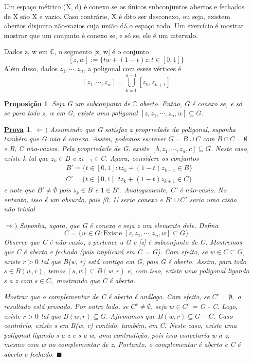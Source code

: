 \documentclass{article}
\newtheorem*{proof*}{\underline{Prova}}
\newtheorem*{prop*}{\underline{Proposi\c c\~ao}}
\renewcommand\qedsymbol{$\blacksquare$}
\begin{document}
  Um espa\c co m\'etrico (X, d) \'e conexo se os \'unicos subconjuntos abertos e fechados de X s\~ao X e vazio. Caso contr\'ario,
X \'e dito ser desconexo, ou seja, existem abertos disjunto n\~ao-vazios cuja uni\~ao d\'a o espa\c co todo. Um exerc\'icio \'e mostrar
mostrar que um conjunto \'e conexo se, e s\'o se, ele \'e um intervalo.

  Dados z, w em $\mathbb{C}$, o segmento [z, w] \'e o conjunto
  $$
  [z, w]:= \{tw + (1-t)z: t\in[0, 1]\}
  $$
  Al\'em disso, dados $z _{1}, \cdots, z _{n}$, a poligonal com esses v\'ertices \'e
  $$
  [z _{1}, \cdots, z _{n}] = \bigcup _{k=1}^{n-1}[z _{k}, z _{k+1}]
  $$
 \begin{prop*}
   Seja G um subconjunto de $\mathbb{C}$ aberto. Ent\~ao, G \'e conexo se, e s\'o se para todo z, w em G, existe uma poligonal
  $[z, z _{1}, \cdots, z _{n}, w]\subseteq{G}.$
 \end{prop*}
\begin{proof*}
  $\Leftarrow)$ Assumindo que G satisfaz a propriedade da poligonal, suponha tamb\'em que G n\~ao \'e conexo. Assim,
podemos escrever $G = B\cup{C}$ com $B\cap{C}=\emptyset$ e B, C n\~ao-vazios. Pela propriedade de G, existe 
  $[b, z _{1}, \cdots, z _{n}, c]\subseteq{G}$. Neste caso, existe k tal que $z _{k}\in{B}$ e $z _{k+1}\in{C}.$ Agora,
  considere os conjuntos 
 \begin{align*}
   &B' = \{t\in[0, 1]: tz _{k} + (1 - t)z _{k+1}\in{B}\}\\
   &C' = \{t\in[0, 1]: tz _{k} + (1 - t)z _{k+1}\in{C}\}
 \end{align*}
e note que $B'\neq{\emptyset}$ pois $z _{k}\in{B}$ e $1\in{B'}$. Analogamente, C' \'e n\~ao-vazio. No entanto, isso \'e um absurdo,
pois [0, 1] seria conexo e $B'\cup{C'}$ seria uma cis\~ao n\~ao trivial

 $\Rightarrow)$ Suponha, agora, que G \'e conexo e seja z um elemento dele. Defina 
 $$
 C = \{w\in{G}: \text{Existe } [z, z _{1}, \cdots, z _{n}, w]\subseteq{G}\}
 $$
 Observe que C \'e n\~ao-vazio, z pertence a G e [z] \'e subconjunto de G. Mostremos que C \'e aberto e fechado (pois implicar\'a em C = G).
Com efeito, se $w\in{C}\subseteq{G}$, existe $r>0$ tal que B(w, r) est\'a contigo em G, pois G \'e aberto.
 Assim, para todo $s\in B(w, r)$, temos $[s, w]\subseteq{B(w, r)}$ e, com isso, existe uma poligonal ligando s a z com $s\in{C},$ mostrando 
que C \'e aberto.

  Mostrar que o complementar de C \'e aberto \'e an\'alogo. Com efeito, se $C ^{c} = \emptyset,$ o resultado est\'a provado. Por outro
lado, se $C ^{c}\neq\emptyset$, seja $w\in{C ^{c}}$ = G - C. Logo, existe $r > 0$ tal que $B(w, r)\subseteq{G}$. Afirmamos
que $B(w, r)\subseteq{G-C}$. Caso contr\'ario, existe s em B(w, r) contido, tamb\'em, em C. Neste caso, existe uma poligonal
ligando s a z e s a w, uma contradi\c c\~ao, pois isso conectaria w a z, mesmo com w no complementar de z. Portanto, o complementar
\'e aberto e C \'e aberto e fechado. \qedsymbol
\end{proof*}
\newpage
\end{document}
